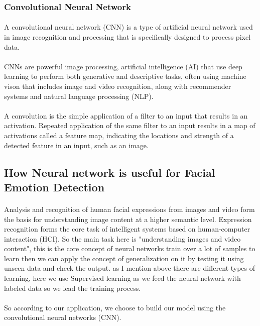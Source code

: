\subsubsection{Convolutional Neural Network}
\paragraph{}
A convolutional neural network (CNN) is a type of artificial neural network used in image recognition and processing that is specifically designed to process pixel data.

\paragraph{}
CNNs are powerful image processing, artificial intelligence (AI) that use deep learning to perform both generative and descriptive tasks, often using machine vison that includes image and video recognition, along with recommender systems and natural language processing (NLP).
\paragraph{}
A convolution is the simple application of a filter to an input that results in an activation. Repeated application of the same filter to an input results in a map of activations called a feature map, indicating the locations and strength of a detected feature in an input, such as an image.
\subsection{How Neural network is  useful for Facial Emotion Detection}
\paragraph{}
Analysis and recognition of human facial expressions
from images and video form the basis for understanding
image content at a higher semantic level. Expression
recognition forms the core task of intelligent systems
based on human-computer interaction (HCI). So the main task here is "understanding images and video content", this is the core concept of neural networks train over a lot of samples to learn then we can apply the concept of generalization on it by testing it using unseen data and check the output. 
as I mention above  there are different types of learning, here we  use Supervised learning as we feed the neural network with labeled data so we lead the training process.
\paragraph{}
So according to our application, we choose to build our model using the convolutional neural networks (CNN).
